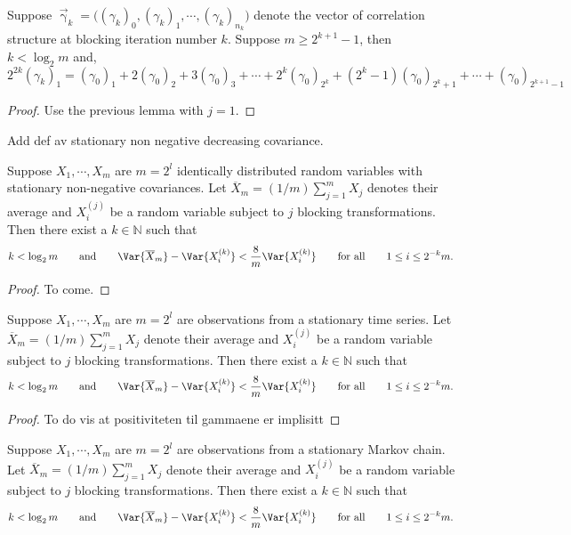 \documentclass[11pt,english,a4paper]{article}
\begin{document}
\begin{prop}
Suppose $\vec{\upgamma}_k = \big((\gamma_k)_0 , (\gamma_k)_1, \cdots, (\gamma_k)_{n_k}\big)$ denote the vector of correlation structure at blocking iteration number $k$. Suppose $m \geq 2^{k+1} - 1$, then $k < \log_2 m$ and,
\[
2^{  2k}(\gamma_k)_1 = (\gamma_0)_1 + 2(\gamma_0)_2 + 3 (\gamma_0)_3 + \cdots +2^k(\gamma_0)_{2^k} + (2^k-1)(\gamma_0)_{2^k+1} + \cdots + (\gamma_0)_{2^{k+1}-1}
\] \label{prop:sequence}
\end{prop}
\begin{proof}
Use the previous lemma with $j=1$.
\end{proof}
Add def av stationary non negative decreasing covariance.
\begin{theorem}
Suppose $X_1,\cdots, X_m$ are $m = 2^l$ identically distributed random variables with stationary non-negative covariances. Let $\overline X_m = (1/m)\sum_{j=1}^m X_j$ denotes their average and $X^{(j)}_i$ be a random variable subject to $j$ blocking transformations. Then there exist a $k \in \mathbb{N}$ such that 
\[
k < \log_2 m \qquad \text{and} \qquad \Var{\overline X_m} - \Var{X^{(k)}_i} < \frac{8}{m}\Var{X^{(k)}_i} \qquad \text{for all} \qquad 1 \leq i \leq 2^{-k}m.
\]
\end{theorem}
\begin{proof}
To come.%
\end{proof}

\begin{corollary}
Suppose $X_1,\cdots, X_m$ are $m = 2^l$ are observations from a stationary time series. Let $\overline X_m = (1/m)\sum_{j=1}^m X_j$ denote their average and $X^{(j)}_i$ be a random variable subject to $j$ blocking transformations. Then there exist a $k \in \mathbb{N}$ such that 
\[
k < \log_2 m \qquad \text{and} \qquad \Var{\overline X_m} - \Var{X^{(k)}_i} < \frac{8}{m}\Var{X^{(k)}_i} \qquad \text{for all} \qquad 1 \leq i \leq 2^{-k}m.
\]
\end{corollary}
\begin{proof}
To do vis at positiviteten til gammaene er implisitt
\end{proof}
\begin{corollary}
Suppose $X_1,\cdots, X_m$ are $m = 2^l$ are observations from a stationary Markov chain. Let $\overline X_m = (1/m)\sum_{j=1}^m X_j$ denote their average and $X^{(j)}_i$ be a random variable subject to $j$ blocking transformations. Then there exist a $k \in \mathbb{N}$ such that 
\[
k < \log_2 m \qquad \text{and} \qquad \Var{\overline X_m} - \Var{X^{(k)}_i} < \frac{8}{m}\Var{X^{(k)}_i} \qquad \text{for all} \qquad 1 \leq i \leq 2^{-k}m.
\]
\end{corollary}
\end{document}
